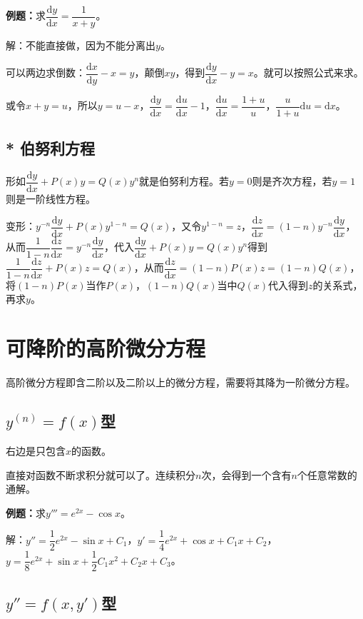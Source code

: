 \documentclass[UTF8, 12pt]{ctexart}
\begin{document}
\textbf{例题：}求$\dfrac{\textrm{d}y}{\textrm{d}x}=\dfrac{1}{x+y}$。

解：不能直接做，因为不能分离出$y$。

可以两边求倒数：$\dfrac{\textrm{d}x}{\textrm{d}y}-x=y$，颠倒$xy$，得到$\dfrac{\textrm{d}y}{\textrm{d}x}-y=x$。就可以按照公式来求。

或令$x+y=u$，所以$y=u-x$，$\dfrac{\textrm{d}y}{\textrm{d}x}=\dfrac{\textrm{d}u}{\textrm{d}x}-1$，$\dfrac{\textrm{d}u}{\textrm{d}x}=\dfrac{1+u}{u}$，$\dfrac{u}{1+u}\textrm{d}u=\textrm{d}x$。

\subsection{* 伯努利方程}

形如$\dfrac{\textrm{d}y}{\textrm{d}x}+P(x)y=Q(x)y^n$就是伯努利方程。若$y=0$则是齐次方程，若$y=1$则是一阶线性方程。

变形：$y^{-n}\dfrac{\textrm{d}y}{\textrm{d}x}+P(x)y^{1-n}=Q(x)$，又令$y^{1-n}=z$，$\dfrac{\textrm{d}z}{\textrm{d}x}=(1-n)y^{-n}\dfrac{\textrm{d}y}{\textrm{d}x}$，从而$\dfrac{1}{1-n}\dfrac{\textrm{d}z}{\textrm{d}x}=y^{-n}\dfrac{\textrm{d}y}{\textrm{d}x}$，代入$\dfrac{\textrm{d}y}{\textrm{d}x}+P(x)y=Q(x)y^n$得到$\dfrac{1}{1-n}\dfrac{\textrm{d}z}{\textrm{d}x}+P(x)z=Q(x)$，从而$\dfrac{\textrm{d}z}{\textrm{d}x}=(1-n)P(x)z=(1-n)Q(x)$，将$(1-n)P(x)$当作$P(x)$，$(1-n)Q(x)$当中$Q(x)$代入得到$z$的关系式，再求$y$。

\section{可降阶的高阶微分方程}

高阶微分方程即含二阶以及二阶以上的微分方程，需要将其降为一阶微分方程。

\subsection{\texorpdfstring{$y^{(n)}=f(x)$}\ 型}

右边是只包含$x$的函数。

直接对函数不断求积分就可以了。连续积分$n$次，会得到一个含有$n$个任意常数的通解。

\textbf{例题：}求$y'''=e^{2x}-\cos x$。

解：$y''=\dfrac{1}{2}e^{2x}-\sin x+C_1$，$y'=\dfrac{1}{4}e^{2x}+\cos x+C_1x+C_2$，$y=\dfrac{1}{8}e^{2x}+\sin x+\dfrac{1}{2}C_1x^2+C_2x+C_3$。

\subsection{\texorpdfstring{$y''=f(x,y')$}\ 型}
\end{document}
